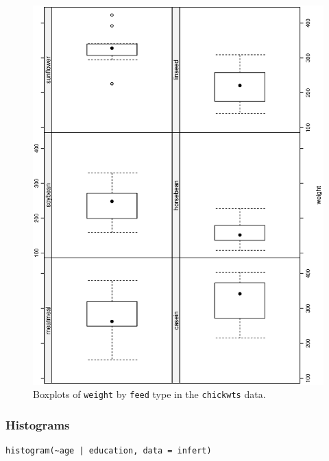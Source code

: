 \documentclass[captions=tableheading]{scrbook}
\begin{document}
\begin{figure}[th]
  \includegraphics[angle=270, totalheight=4in]{ps/datadesc/bwplot.ps}
  \caption{Boxplots of \texttt{weight} by \texttt{feed} type in the \texttt{chickwts} data.}
  \label{fig-bwplot}
\end{figure}
\subsubsection{Histograms}
\label{sec-3-6-3-2}



\lstset{language=R}
\begin{lstlisting}
histogram(~age | education, data = infert)
\end{lstlisting}
\end{document}
